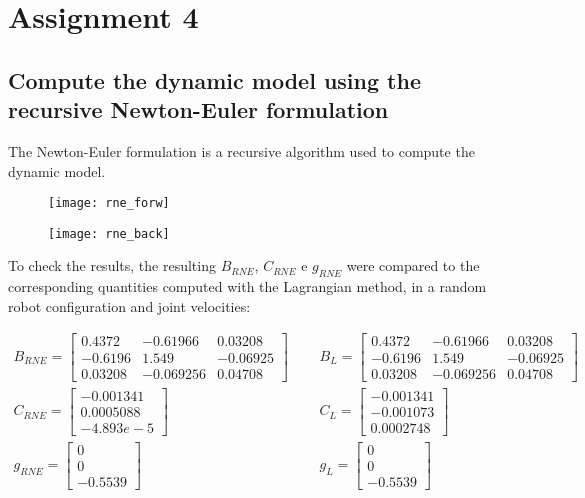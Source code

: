 \section{Assignment 4}

\subsection{Compute the dynamic model using the recursive Newton-Euler formulation}

The Newton-Euler formulation is a recursive algorithm used to compute the dynamic model.

\begin{figure}[h]
\centering
\texttt{[image: rne\_forw]}
\end{figure}
\begin{figure}[h]
\centering
\texttt{[image: rne\_back]}
\end{figure}

To check the results, the resulting $B_{RNE}$, $C_{RNE}$ e $g_{RNE}$ were compared to the corresponding quantities computed with the Lagrangian method, in a random robot configuration and joint velocities:

\begin{align*}
B_{RNE} = \begin{bmatrix}
 0.4372& -0.61966  & 0.03208\\
-0.6196&    1.549 &-0.06925\\
 0.03208& -0.069256  &0.04708
\end{bmatrix}&\;\;\;\;\; B_{L} = \begin{bmatrix}
 0.4372& -0.61966   &0.03208\\
-0.6196&    1.549& -0.06925\\
 0.03208& -0.069256 & 0.04708
\end{bmatrix}\\
C_{RNE} = \begin{bmatrix}
 -0.001341\\
0.0005088\\
 -4.893e-5
\end{bmatrix}&\;\;\;\;\; C_{L} = \begin{bmatrix}
 -0.001341\\
  -0.001073\\
0.0002748
\end{bmatrix}\\
g_{RNE} = \begin{bmatrix}
 0\\
  0\\
-0.5539
\end{bmatrix}&\;\;\;\;\; g_{L} = \begin{bmatrix}
0\\
 0\\
-0.5539
\end{bmatrix}\\
\end{align*}
